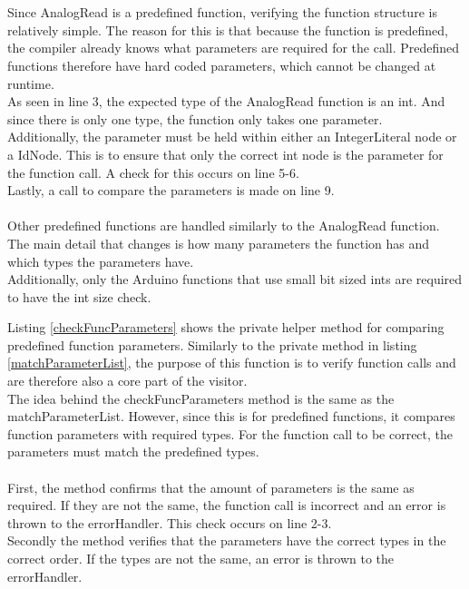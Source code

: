 \\\\
Since AnalogRead is a predefined function, verifying the function structure is relatively simple. The reason for this is that because the function is predefined, the compiler already knows what parameters are required for the call. Predefined functions therefore have hard coded parameters, which cannot be changed at runtime.\\
As seen in line 3, the expected type of the AnalogRead function is an int. And since there is only one type, the function only takes one parameter.\\
Additionally, the parameter must be held within either an IntegerLiteral node or a IdNode. This is to ensure that only the correct int node is the parameter for the function call. A check for this occurs on line 5-6.\\
Lastly, a call to compare the parameters is made on line 9.
\\\\
Other predefined functions are handled similarly to the AnalogRead function. The main detail that changes is how many parameters the function has and which types the parameters have.\\
Additionally, only the Arduino functions that use small bit sized ints are required to have the int size check.

\noindent\newline
Listing \ref{checkFuncParameters} shows the private helper method for comparing predefined function parameters. Similarly to the private method in listing \ref{matchParameterList}, the purpose of this function is to verify function calls and are therefore also a core part of the visitor.\\
The idea behind the checkFuncParameters method is the same as the matchParameterList. However, since this is for predefined functions, it compares function parameters with required types. For the function call to be correct, the parameters must match the predefined types.
\\\\
First, the method confirms that the amount of parameters is the same as required. If they are not the same, the function call is incorrect and an error is thrown to the errorHandler. This check occurs on line 2-3.\\
Secondly the method verifies that the parameters have the correct types in the correct order. If the types are not the same, an error is thrown to the errorHandler.\\
